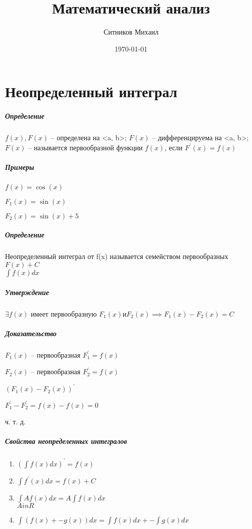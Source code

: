 \documentclass[a4paper]{article}
\title{Математический анализ}
\author{Ситников Михаил}
\date{\today}
\begin{document}
\maketitle
\tableofcontents
\newpage

\chapter{Неопределенный интеграл}
\paragraph{Определение}
$f(x), F(x)$ -- определена на <a, b>; $F(x)$ -- дифференцируема на <a, b>; $F(x)$ -- называется первообразной функции $f(x)$, если $F^{'}(x) = f(x)$ 
\paragraph{Примеры}
\par $f(x) = \cos(x)$ 
\par $ F_1(x) = \sin(x)$
\par $F_2(x) = \sin(x) + 5$ 
\paragraph{Определение}
Неопределенный интеграл от f(x) называется семейством первообразных ${F(x) + C}$ \\ $\int f(x)dx$ 
\paragraph{Утверждение}
$\exists  f(x)$ имеет первообразную $F_1(x) и F_2(x) \implies F_1(x) - F_2(x) = C$
\paragraph{Доказательство}
$F_1(x)$ -- первообразная  $F_1^{'}=f(x)$ 
\par $F_2(x)$ -- первообразная  $F_2^{'} = f(x)$ 
\par $(F_1(x) - F_2(x))^{'}$ 
\par $F_1^{'} - F_2^{'} = f(x) - f(x) = 0$ 
\par ч. т. д.

\paragraph{Свойства неопределенных интегралов}
\begin{enumerate}
  \item $(\int f(x)dx)^{'} = f(x)$ 
  \item $\int f^{'}(x)dx = f(x) + C$ 
  \item $\int Af(x)dx = A\int f(x)dx$ 
    \\ $A in R$
  \item  $\int(f(x) +- g(x))dx = \int f(x)dx +- \int g(x)dx$
\end{enumerate}
\end{document}
